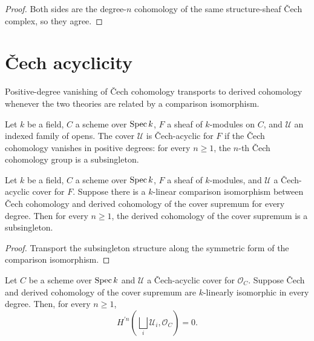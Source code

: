 \begin{proof}
  \leanok
  Both sides are the degree-\(n\) cohomology of the same structure-sheaf \v{C}ech complex, so they agree.
\end{proof}

\section{\v{C}ech acyclicity}
\label{sec:moduleK_cech_acyclic_cover}

Positive-degree vanishing of \v{C}ech cohomology transports to derived cohomology whenever the two theories are related by a comparison isomorphism.

\begin{definition}\leanok
  \label{def:Scheme_IsCechAcyclicCover}
  
  Let \(k\) be a field, \(C\) a scheme over \(\operatorname{Spec} k\), \(F\) a sheaf of \(k\)-modules on \(C\), and \(\mathcal U\) an indexed family of opens. The cover \(\mathcal U\) is \v{C}ech-acyclic for \(F\) if the \v{C}ech cohomology vanishes in positive degrees: for every \(n \ge 1\), the \(n\)-th \v{C}ech cohomology group is a subsingleton.
\end{definition}

\begin{theorem}\leanok
  \label{thm:Scheme_subsingleton_HModule_prime_supr_of_isCechAcyclicCover}
  
  Let \(k\) be a field, \(C\) a scheme over \(\operatorname{Spec} k\), \(F\) a sheaf of \(k\)-modules, and \(\mathcal U\) a \v{C}ech-acyclic cover for \(F\). Suppose there is a \(k\)-linear comparison isomorphism between \v{C}ech cohomology and derived cohomology of the cover supremum for every degree. Then for every \(n \ge 1\), the derived cohomology of the cover supremum is a subsingleton.
\end{theorem}

\begin{proof}
  
  \leanok
  Transport the subsingleton structure along the symmetric form of the comparison isomorphism.
\end{proof}

\begin{theorem}\leanok
  \label{thm:Scheme_subsingleton_HModule_prime_supr_of_isCechAcyclicCover_curve}
  
  Let \(C\) be a scheme over \(\operatorname{Spec} k\) and \(\mathcal U\) a \v{C}ech-acyclic cover for \(\mathcal O_C\). Suppose \v{C}ech and derived cohomology of the cover supremum are \(k\)-linearly isomorphic in every degree. Then, for every \(n\geq 1\),
  \[
    H^{\prime n}\!\left(\bigsqcup_i \mathcal U_i,\mathcal O_C\right)=0.
  \]
\end{theorem}

